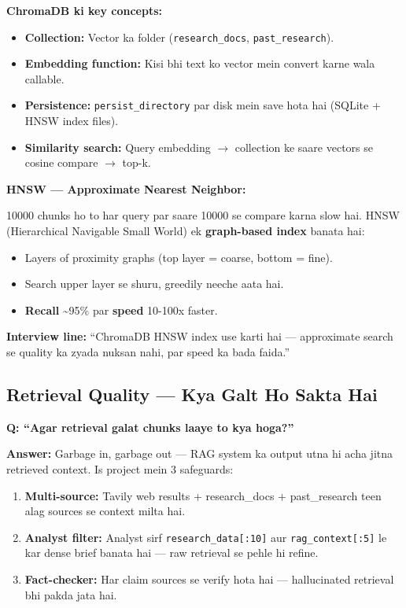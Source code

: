 \begin{conceptbox}
\textbf{ChromaDB ki key concepts:}
\begin{itemize}
\item \textbf{Collection:} Vector ka folder (\texttt{research\_docs}, \texttt{past\_research}).
\item \textbf{Embedding function:} Kisi bhi text ko vector mein convert karne wala callable.
\item \textbf{Persistence:} \texttt{persist\_directory} par disk mein save hota hai (SQLite + HNSW index files).
\item \textbf{Similarity search:} Query embedding $\rightarrow$ collection ke saare vectors se cosine compare $\rightarrow$ top-k.
\end{itemize}
\end{conceptbox}

\begin{mathbox}
\textbf{HNSW --- Approximate Nearest Neighbor:}

10000 chunks ho to har query par saare 10000 se compare karna slow hai. HNSW (Hierarchical Navigable Small World) ek \textbf{graph-based index} banata hai:
\begin{itemize}
\item Layers of proximity graphs (top layer = coarse, bottom = fine).
\item Search upper layer se shuru, greedily neeche aata hai.
\item \textbf{Recall} \textasciitilde95\% par \textbf{speed} 10-100x faster.
\end{itemize}
\textbf{Interview line:} ``ChromaDB HNSW index use karti hai --- approximate search se quality ka zyada nuksan nahi, par speed ka bada faida.''
\end{mathbox}

\subsection{Retrieval Quality --- Kya Galt Ho Sakta Hai}

\begin{interviewbox}
\textbf{Q: ``Agar retrieval galat chunks laaye to kya hoga?''}

\textbf{Answer:} Garbage in, garbage out --- RAG system ka output utna hi acha jitna retrieved context. Is project mein 3 safeguards:
\begin{enumerate}[label=\arabic*.]
\item \textbf{Multi-source:} Tavily web results + research\_docs + past\_research teen alag sources se context milta hai.
\item \textbf{Analyst filter:} Analyst sirf \texttt{research\_data[:10]} aur \texttt{rag\_context[:5]} le kar dense brief banata hai --- raw retrieval se pehle hi refine.
\item \textbf{Fact-checker:} Har claim sources se verify hota hai --- hallucinated retrieval bhi pakda jata hai.
\end{enumerate}
\end{interviewbox}

